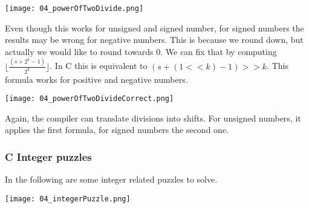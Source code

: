 \texttt{[image: 04\_powerOfTwoDivide.png]}

Even though this works for unsigned and signed number, for signed numbers the results may be wrong for negative numbers. 
This is because we round down, but actually we would like to round towards $0$. We can fix that by computing $\lfloor \frac{(s + 2^k - 1)}{2^k} \rfloor$. In C this is equivalent to $(s + (1 << k) -1) >> k$. This formula works for positive and negative numbers.

\texttt{[image: 04\_powerOfTwoDivideCorrect.png]}


Again, the compiler can translate divisions into shifts. For unsigned numbers, it applies the first formula, for signed numbers the second one.

\subsubsection{C Integer puzzles}
In the following are some integer related puzzles to solve.

\texttt{[image: 04\_integerPuzzle.png]}
